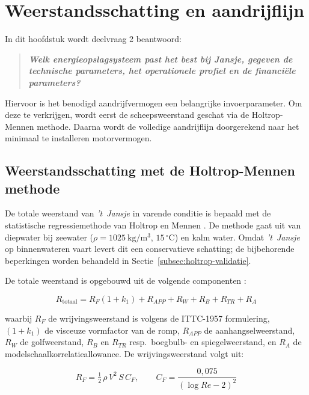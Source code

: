 \chapter{Weerstandsschatting en aandrijflijn}
\label{ch:holtrop-aandrijflijn}

\noindent In dit hoofdstuk wordt deelvraag 2 beantwoord:

\begin{quote}
    \textit{\textbf{Welk energieopslagsysteem past het best bij Jansje, gegeven de
    technische parameters, het operationele profiel en de financiële parameters?}}
\end{quote}

\noindent Hiervoor is het benodigd aandrijfvermogen een belangrijke
invoerparameter. Om deze te verkrijgen, wordt eerst de scheepsweerstand geschat via de
Holtrop-Mennen methode. Daarna wordt de volledige aandrijflijn doorgerekend naar
het minimaal te installeren motorvermogen.

\section{Weerstandsschatting met de Holtrop-Mennen methode}
\label{sec:holtrop}

De totale weerstand van \emph{'t~Jansje} in varende conditie is bepaald met de
statistische regressiemethode van Holtrop en Mennen \cite{Holtrop1984}. De methode
gaat uit van diepwater bij zeewater ($\rho = 1025\ \mathrm{kg/m^3}$,
$15\,^{\circ}\mathrm{C}$) en kalm water. Omdat \emph{'t~Jansje} op binnenwateren
vaart levert dit een conservatieve schatting; de bijbehorende beperkingen worden
behandeld in Sectie~\ref{subsec:holtrop-validatie}.

De totale weerstand is opgebouwd uit de volgende componenten \cite{Holtrop1984}:

\begin{equation}
    R_\mathrm{totaal} = R_F(1+k_1) + R_{APP} + R_W + R_B + R_{TR} + R_A
    \label{eq:Rtot}
\end{equation}

\noindent waarbij $R_F$ de wrijvingsweerstand is volgens de ITTC-1957 formulering,
$(1+k_1)$ de visceuze vormfactor van de romp, $R_{APP}$ de aanhangselweerstand,
$R_W$ de golfweerstand, $R_B$ en $R_{TR}$ resp.\ boegbulb- en spiegelweerstand,
en $R_A$ de modelschaalkorrelatieallowance. De wrijvingsweerstand volgt uit:

\begin{equation}
    R_F = \tfrac{1}{2}\,\rho\,V^2\,S\,C_F, \qquad
    C_F = \frac{0{,}075}{(\log Re - 2)^2}
    \label{eq:RF}
\end{equation}

